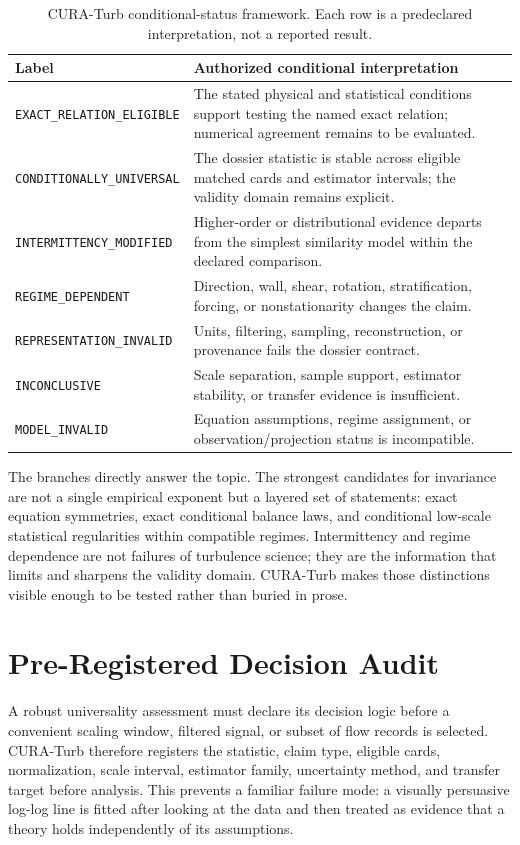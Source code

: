 \documentclass[conference]{../../../../Conference-LaTeX-template_10-17-19/IEEEtran}
\begin{document}
\begin{table}[!t]
\caption{CURA-Turb conditional-status framework. Each row is a predeclared interpretation, not a reported result.}
\label{tab:branches}
\centering
\footnotesize
\begin{tabularx}{\columnwidth}{lY}
\toprule
Label & Authorized conditional interpretation \\
\midrule
\texttt{EXACT\_RELATION\_ELIGIBLE} & The stated physical and statistical conditions support testing the named exact relation; numerical agreement remains to be evaluated. \\
\texttt{CONDITIONALLY\_UNIVERSAL} & The dossier statistic is stable across eligible matched cards and estimator intervals; the validity domain remains explicit. \\
\texttt{INTERMITTENCY\_MODIFIED} & Higher-order or distributional evidence departs from the simplest similarity model within the declared comparison. \\
\texttt{REGIME\_DEPENDENT} & Direction, wall, shear, rotation, stratification, forcing, or nonstationarity changes the claim. \\
\texttt{REPRESENTATION\_INVALID} & Units, filtering, sampling, reconstruction, or provenance fails the dossier contract. \\
\texttt{INCONCLUSIVE} & Scale separation, sample support, estimator stability, or transfer evidence is insufficient. \\
\texttt{MODEL\_INVALID} & Equation assumptions, regime assignment, or observation/projection status is incompatible. \\
\bottomrule
\end{tabularx}
\end{table}

The branches directly answer the topic. The strongest candidates for invariance are not a single empirical exponent but a layered set of statements: exact equation symmetries, exact conditional balance laws, and conditional low-scale statistical regularities within compatible regimes. Intermittency and regime dependence are not failures of turbulence science; they are the information that limits and sharpens the validity domain. CURA-Turb makes those distinctions visible enough to be tested rather than buried in prose.

\section{Pre-Registered Decision Audit}
A robust universality assessment must declare its decision logic before a convenient scaling window, filtered signal, or subset of flow records is selected. CURA-Turb therefore registers the statistic, claim type, eligible cards, normalization, scale interval, estimator family, uncertainty method, and transfer target before analysis. This prevents a familiar failure mode: a visually persuasive log-log line is fitted after looking at the data and then treated as evidence that a theory holds independently of its assumptions.
\end{document}
